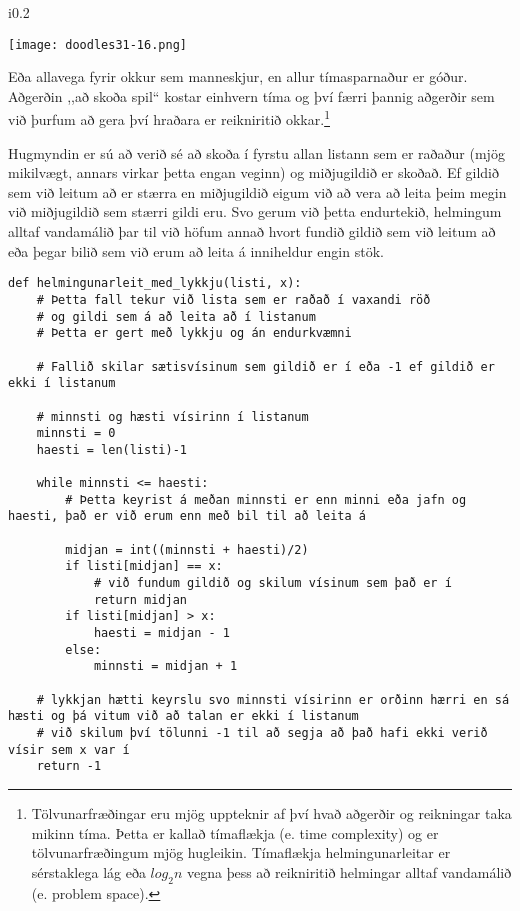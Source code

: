 \begin{wrapfigure}{i}{0.2\textwidth} %
\begin{center}
	\texttt{[image: doodles31-16.png]}
\end{center}
\end{wrapfigure}
Eða allavega fyrir okkur sem manneskjur, en allur tímasparnaður er góður.
Aðgerðin ,,að skoða spil“ kostar einhvern tíma og því færri þannig aðgerðir sem við þurfum að gera því hraðara er reikniritið okkar.\footnote{Tölvunarfræðingar eru mjög uppteknir af því hvað aðgerðir og reikningar taka mikinn tíma.
Þetta er kallað tímaflækja (e. time complexity) og er tölvunarfræðingum mjög hugleikin.
Tímaflækja helmingunarleitar er sérstaklega lág eða $log_2{n}$ vegna þess að reikniritið helmingar alltaf vandamálið (e. problem space).}

Hugmyndin er sú að verið sé að skoða í fyrstu allan listann sem er raðaður (mjög mikilvægt, annars virkar þetta engan veginn) og miðjugildið er skoðað.
Ef gildið sem við leitum að er stærra en miðjugildið eigum við að vera að leita þeim megin við miðjugildið sem stærri gildi eru.
Svo gerum við þetta endurtekið, helmingum alltaf vandamálið þar til við höfum annað hvort fundið gildið sem við leitum að eða þegar bilið sem við erum að leita á inniheldur engin stök.


\begin{lstlisting}[caption=Helmingunarleit að tölu í röðuðum lista með lykkju, label=lst:reiknirit-helm-for]
	def helmingunarleit_med_lykkju(listi, x):
	# Þetta fall tekur við lista sem er raðað í vaxandi röð
	# og gildi sem á að leita að í listanum
	# Þetta er gert með lykkju og án endurkvæmni
	
	# Fallið skilar sætisvísinum sem gildið er í eða -1 ef gildið er ekki í listanum
	
	# minnsti og hæsti vísirinn í listanum
	minnsti = 0
	haesti = len(listi)-1
	
	while minnsti <= haesti:
		# Þetta keyrist á meðan minnsti er enn minni eða jafn og haesti, það er við erum enn með bil til að leita á
	
		midjan = int((minnsti + haesti)/2)
		if listi[midjan] == x:
			# við fundum gildið og skilum vísinum sem það er í
			return midjan
		if listi[midjan] > x:
			haesti = midjan - 1
		else:
			minnsti = midjan + 1
	
	# lykkjan hætti keyrslu svo minnsti vísirinn er orðinn hærri en sá hæsti og þá vitum við að talan er ekki í listanum 
	# við skilum því tölunni -1 til að segja að það hafi ekki verið vísir sem x var í
	return -1
\end{lstlisting}

